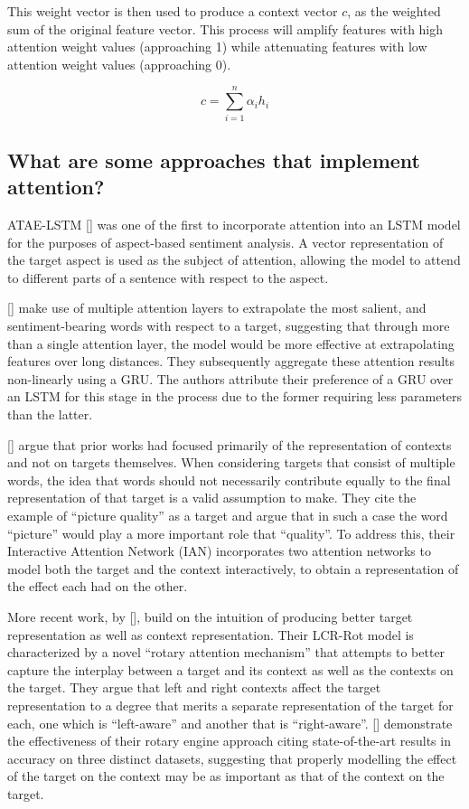 \documentclass[12pt, a4paper]{report}
\theoremstyle{definition}
\theoremstyle{definition}%
\theoremstyle{definition}%
\theoremstyle{definition}%
\theoremstyle{definition}%
\theoremstyle{definition}%
\renewcommand{\cite}[1]{[\citealp{#1}]}
\begin{document}
This weight vector is then used to produce a context vector $c$, as the weighted sum of the original feature vector. This process will amplify features with high attention weight values (approaching 1) while attenuating features with low attention weight values (approaching 0).

\begin{equation} \label{eq:attention_weighted_sum}
    c = \sum_{i=1}^{n}\alpha_{i}h_{i}
\end{equation}

\subsection{What are some approaches that implement attention?}
ATAE-LSTM \cite{wang} was one of the first to incorporate attention into an LSTM model for the purposes of aspect-based sentiment analysis. A vector representation of the target aspect is used as the subject of attention, allowing the model to attend to different parts of a sentence with respect to the aspect.  

\cite{chen2017} make use of multiple attention layers to extrapolate the most salient, and sentiment-bearing words with respect to a target, suggesting that through more than a single attention layer, the model would be more effective at extrapolating features over long distances. They subsequently aggregate these attention results non-linearly using a GRU. The authors attribute their preference of a GRU over an LSTM for this stage in the process due to the former requiring less parameters than the latter. 

\cite{dehongma2017} argue that prior works had focused primarily of the representation of contexts and not on targets themselves. When considering targets that consist of multiple words, the idea that words should not necessarily contribute equally to the final representation of that target is a valid assumption to make. They cite the example of \enquote{picture quality} as a target and argue that in such a case the word \enquote{picture} would play a more important role that \enquote{quality}. To address this, their Interactive Attention Network (IAN) incorporates two attention networks to model both the target and the context interactively, to obtain a representation of the effect each had on the other. 

More recent work, by \cite{zheng2018}, build on the intuition of producing better target representation as well as context representation. Their LCR-Rot model is characterized by a novel \enquote{rotary attention mechanism} that attempts to better capture the interplay between a target and its context as well as the contexts on the target. They argue that left and right contexts affect the target representation to a degree that merits a separate representation of the target for each, one which is \enquote{left-aware} and another that is \enquote{right-aware}. \cite{zheng2018} demonstrate the effectiveness of their rotary engine approach citing state-of-the-art results in accuracy on three distinct datasets, suggesting that properly modelling the effect of the target on the context may be as important as that of the context on the target. 
\end{document}
